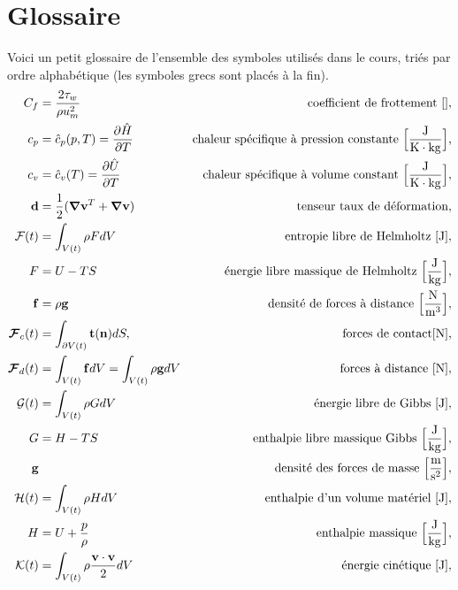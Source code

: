 
\chapter{Glossaire}
  Voici un petit glossaire de l'ensemble des symboles utilisés dans le cours, triés par ordre alphabétique (les symboles grecs sont placés à la fin).
  \begingroup
    \allowdisplaybreaks
    \begin{align*}
      C_f &= \frac{2\tau_w}{\rho u_m^2} & \textrm{coefficient de frottement } [],\\
      c_p &= \hat{c}_p(p,T) = \pdv{\hat{H}}{T} & \textrm{chaleur spécifique à pression constante } \Big[\si{\frac{J}{K \cdot kg}}\Big],\\
      c_v &= \hat{c}_v (T) = \pdv{\hat{U}}{T} & \textrm{chaleur spécifique à volume constant } \Big[\si{\frac{J}{K \cdot kg}}\Big],\\
      \vb{d} &= \recip{2}(\grad\vb{v}^T + \grad\vb{v}) & \textrm{tenseur taux de déformation},\\
      \mathcal{F}(t) &= \int_{V(t)} \rho F dV & \textrm{entropie libre de Helmholtz } [\si{J}],\\
      F &= U - TS & \textrm{énergie libre massique de Helmholtz } \Big[\si{\frac{J}{kg}}\Big],\\
      \vb{f} &= \rho \vb{g} & \textrm{densité de forces à distance } \Big[\si{\frac{N}{m^3}}\Big], \\
      \bs{\mathcal{F}}_c (t) &= \int_{\partial V(t)} \vb{t}(\vb{n}) dS, & \textrm{forces de contact} [\si{N}],\\
      \bs{\mathcal{F}}_d (t) &= \int_{V(t)} \vb{f} dV = \int_{V(t)} \rho \vb{g} dV & \textrm{forces à distance } [\si{N}],\\
      \mathcal{G}(t) &= \int_{V(t)} \rho G dV & \textrm{énergie libre de Gibbs } [\si{J}],\\
      G &= H -TS & \textrm{enthalpie libre massique Gibbs } \Big[\si{\frac{J}{kg}}\Big],\\
      \vb{g} & & \textrm {densité des forces de masse } \Big[\si{\frac{m}{s^2}}\Big],\\
      \mathcal{H}(t) &= \int_{V(t)} \rho H dV & \textrm{enthalpie d'un volume matériel } [\si{J}],\\
      H &= U + \frac{p}{\rho} & \textrm{enthalpie massique } \Big[\si{\frac{J}{kg}}\Big],\\
      \mathcal{K}(t) &= \int_{V(t)} \rho \frac{\vb{v}\cdot\vb{v}}{2} dV & \textrm{énergie cinétique } [\si{J}],\\

\end{align*}
